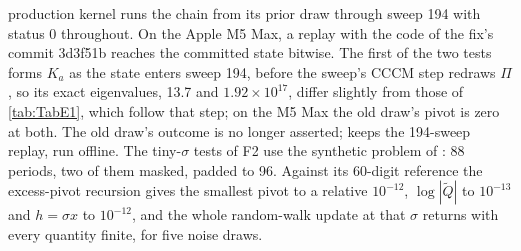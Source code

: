 production kernel runs the chain from its prior draw through sweep 194 with status 0 throughout.
On the Apple M5 Max, a replay with the code of the fix's commit 3d3f51b reaches the committed state
bitwise. The first of the two tests forms $K_a$ as the state enters sweep 194, before the sweep's CCCM step redraws $\Pi$, so its exact eigenvalues,
13.7 and $1.92\times10^{17}$, differ slightly from those of \cref{tab:TabE1}, which follow that step;
on the M5 Max the old draw's pivot is zero at both.
The old draw's outcome is no longer asserted;  keeps the 194-sweep
replay, run offline.
The tiny-$\sigma$ tests of F2 use the synthetic problem  of : 88 periods, two of them masked, padded to 96.
Against its 60-digit reference the excess-pivot recursion gives the smallest pivot to a relative
$10^{-12}$, $\log|\tilde Q|$ to $10^{-13}$ and $h = \sigma x$ to $10^{-12}$, and the whole random-walk
update at that $\sigma$ returns  with every quantity finite, for five noise draws.
